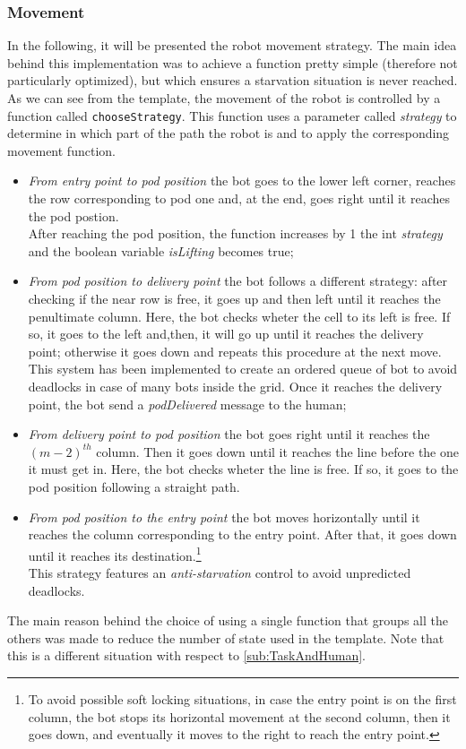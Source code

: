 \documentclass{article}
\begin{document}
			\subsubsection{Movement}
				In the following, it will be presented the robot movement strategy. The main idea behind this implementation was to achieve a function pretty simple (therefore not particularly optimized), but which ensures a starvation situation is never reached.\\
				As we can see from the template, the movement of the robot is controlled by a function called \verb|chooseStrategy|. This function uses a parameter called \emph{strategy} to determine in which part of the path the robot is and to apply the corresponding movement function.
				\begin{itemize}
					\item \emph{From entry point to pod position} the bot goes to the lower left corner, reaches the row corresponding to pod one and, at the end, goes right until it reaches the pod postion.\\After reaching the pod position, the function increases by 1 the int \emph{strategy} and the boolean variable \emph{isLifting} becomes true;
					\item \emph{From pod position to delivery point} the bot follows a different strategy: after checking if the near row is free, it goes up and then left until it reaches the penultimate column. Here, the bot checks wheter the cell to its left is free. If so, it goes to the left and,then, it will go up until it reaches the delivery point; otherwise it goes down and repeats this procedure at the next move.\\This system has been implemented to create an ordered queue of bot to avoid deadlocks in case of many bots inside the grid. Once it reaches the delivery point, the bot send a \emph{podDelivered} message to the human;
					\item \emph{From delivery point to pod position} the bot goes right until it reaches the ${(m-2)}^{th}$ column. Then it goes down until it reaches the line before the one it must get in. Here, the bot checks wheter the line is free. If so, it goes to the pod position following a straight path.
					\item \emph{From pod position to the entry point} the bot moves horizontally until it reaches the column corresponding to the entry point. After that, it goes down until it reaches its destination.\footnote{To avoid possible soft locking situations, in case the entry point is on the first column, the bot stops its horizontal movement at the second column, then it goes down, and eventually it moves to the right to reach the entry point.}\\This strategy features an \emph{anti-starvation} control to avoid unpredicted deadlocks.
				\end{itemize}
				The main reason behind the choice of using a single function that groups all the others was made to reduce the number of state used in the template. Note that this is a different situation with respect to \ref{sub:TaskAndHuman}.
				
\end{document}
